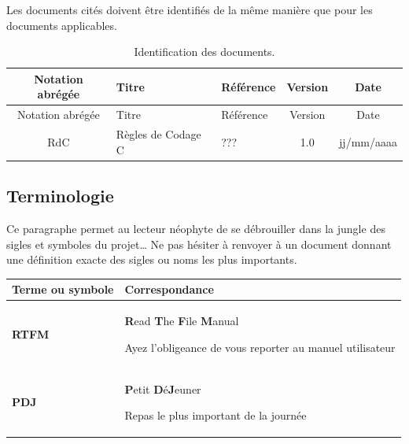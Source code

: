 \documentclass[
  10pt,
]{book}
\begin{document}
Les documents cités doivent être identifiés de la même manière que pour
les documents applicables.

\begin{longtable}[]{@{}cllcc@{}}
\caption{Identification des documents.}\tabularnewline
\toprule
Notation abrégée & Titre & Référence & Version & Date\tabularnewline
\midrule
\endfirsthead
\toprule
Notation abrégée & Titre & Référence & Version & Date\tabularnewline
\midrule
\endhead
RdC & Règles de Codage C & ??? & 1.0 & jj/mm/aaaa\tabularnewline
\bottomrule
\end{longtable}

\hypertarget{terminologie}{%
\subsection{Terminologie}\label{terminologie}}

Ce paragraphe permet au lecteur néophyte de se débrouiller dans la
jungle des sigles et symboles du projet\ldots{} Ne pas hésiter à
renvoyer à un document donnant une définition exacte des sigles ou noms
les plus importants.

\begin{longtable}[]{@{}ll@{}}
\toprule
\begin{minipage}[b]{0.23\columnwidth}\raggedright
Terme ou symbole\strut
\end{minipage} & \begin{minipage}[b]{0.71\columnwidth}\raggedright
Correspondance\strut
\end{minipage}\tabularnewline
\midrule
\endhead
\begin{minipage}[t]{0.23\columnwidth}\raggedright
\textbf{RTFM}\strut
\end{minipage} & \begin{minipage}[t]{0.71\columnwidth}\raggedright
\textbf{R}ead \textbf{T}he \textbf{F}ile \textbf{M}anual

Ayez l'obligeance de vous reporter au manuel utilisateur\strut
\end{minipage}\tabularnewline
\begin{minipage}[t]{0.23\columnwidth}\raggedright
\textbf{PDJ}\strut
\end{minipage} & \begin{minipage}[t]{0.71\columnwidth}\raggedright
\textbf{P}etit \textbf{D}é\textbf{J}euner

Repas le plus important de la journée\strut
\end{minipage}\tabularnewline
\bottomrule
\end{longtable}
\end{document}
